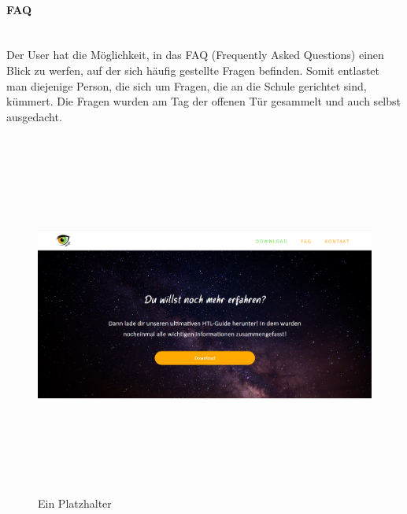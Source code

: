 \paragraph{FAQ} \leavevmode \\
Der User hat die Möglichkeit, in das FAQ (Frequently Asked Questions) einen Blick zu werfen, auf der sich häufig gestellte Fragen befinden. Somit entlastet man diejenige Person, die sich um Fragen, die an die Schule gerichtet sind, kümmert. Die Fragen wurden am Tag der offenen Tür gesammelt und auch selbst ausgedacht. 
\begin{figure}[h]
	\centering				\includegraphics[width=12cm,height=12cm,keepaspectratio]{webseite_abb6} 
	\caption{Ein Platzhalter}
	\label{Abb7}
\end{figure} \leavevmode \newpage
